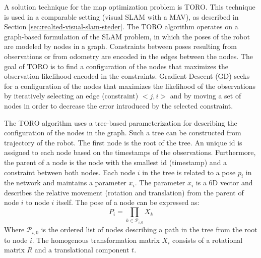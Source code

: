 A solution technique for the map optimization problem is TORO. This technique is used in a comparable setting (visual SLAM with a MAV), as described in Section \ref{sec:realted-visual-slam-steder}.
The TORO algorithm operates on a graph-based formulation of the SLAM problem, in which the poses of the robot are modeled by nodes in a graph.
Constraints between poses resulting from observations or from odometry are encoded in the edges between the nodes.
The goal of TORO is to find a configuration of the nodes that maximizes the observation likelihood encoded in the constraints.
Gradient Descent (GD) \cite{olson2006fast} seeks for a configuration of the nodes that maximizes the likelihood of the observations by iteratively selecting an edge (constraint) $< j, i >$ and by moving a set of nodes
in order to decrease the error introduced by the selected constraint.

\begin{comment}
The nodes are updated according to the following equation: 
\begin{equation}
x^{t + 1} = x^t + \Delta x
\end{equation}
where $x$ is the set of variables describing the locations of the poses in the network, and the term $\Delta x$ is used to move a node in the direction that decreases the error.
The direction of $\Delta x$ is computed from the residual (opposite of the error vector) scaled by the information encoded in the contraint.
In practice, GD decomposes the overall problem into many smaller problems by optimizing the constraints individually.
\end{comment}

The TORO algorithm uses a tree-based parameterization for describing the configuration of the nodes in the graph.
Such a tree can be constructed from trajectory of the robot.
The first node is the root of the tree.
An unique id is assigned to each node based on the timestamps of the observations.
Furthermore, the parent of a node is the node with the smallest id (timestamp) and a constraint between both nodes.
Each node $i$ in the tree is related to a pose $p_i$ in the network and maintains a parameter $x_i$.
The parameter $x_i$ is a 6D vector and describes the relative movement (rotation and translation) from the parent of node $i$ to  node $i$ itself.
The pose of a node can be expressed as:
\begin{equation}
P_i = \prod_{k \in \mathcal{P}_{i,0}} X_k
\end{equation}
Where $\mathcal{P}_{i,0}$ is the ordered list of nodes describing a path in the tree from the root to node $i$.
The homogenous transformation matrix $X_i$ consists of a rotational matrix $R$ and a translational component $t$.

